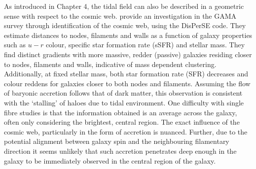 As introduced in Chapter 4, the tidal field can also be described in a geometric sense with respect to the cosmic web. \citet{kraljic2018} provide an investigation in the GAMA survey through identification of the cosmic web, using the DisPerSE code. They estimate distances to nodes, filaments and walls as a function of galaxy properties such as $u - r$ colour, specific star formation rate (sSFR) and stellar mass. They find distinct gradients with more massive, redder (passive) galaxies residing closer to nodes, filaments and walls, indicative of mass dependent clustering. Additionally, at fixed stellar mass, both star formation rate (SFR) decreases and colour reddens for galaxies closer to both nodes and filaments. Assuming the flow of baryonic accretion follows that of dark matter, this observation is consistent with the `stalling' of haloes due to tidal environment. One difficulty with single fibre studies is that the information obtained is an average across the galaxy, often only considering the brightest, central region. The exact influence of the cosmic web, particularly in the form of accretion is nuanced. Further, due to the potential alignment between galaxy spin and the neighbouring filamentary direction it seems unlikely that such accretion penetrates deep enough in the galaxy to be immediately observed in the central region of the galaxy. 

